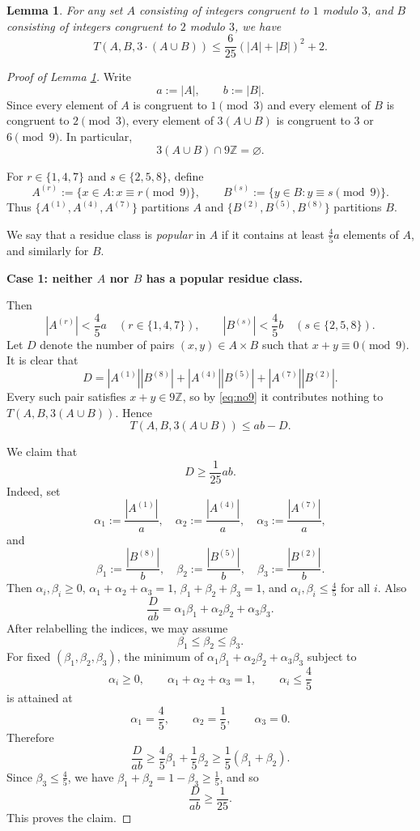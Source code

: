 \documentclass[10pt,a4paper]{amsart}
\newtheorem{lemma}{Lemma}
\begin{document}
\begin{lemma}
\label{lemma ABAcupB}
For any set $A$ consisting of integers congruent to $1$ modulo $3$, and $B$ consisting of integers congruent to $2$ modulo $3$, we have 
$$T(A, B, 3 \cdot (A \cup B)) \leq \frac{6}{25} \left(|A| + |B|\right)^2 + 2.$$
\end{lemma}

\begin{proof}[Proof of Lemma \ref{lemma ABAcupB}]
Write
\[
a:=|A|,\qquad b:=|B|.
\]
Since every element of $A$ is congruent to $1 \pmod 3$ and every element of $B$ is congruent to $2 \pmod 3$, every element of $3(A\cup B)$ is congruent to $3$ or $6 \pmod 9$. In particular,
\begin{equation}
\label{eq:no9}
3(A\cup B)\cap 9\mathbb Z=\varnothing.
\end{equation}

For $r\in\{1,4,7\}$ and $s\in\{2,5,8\}$, define
\[
A^{(r)}:=\{x\in A:x\equiv r \pmod 9\},\qquad
B^{(s)}:=\{y\in B:y\equiv s \pmod 9\}.
\]
Thus $\{A^{(1)},A^{(4)},A^{(7)}\}$ partitions $A$ and $\{B^{(2)},B^{(5)},B^{(8)}\}$ partitions $B$.

We say that a residue class is \emph{popular} in $A$ if it contains at least $\frac45a$ elements of $A$, and similarly for $B$.

\medskip
\noindent\textbf{Case 1: neither $A$ nor $B$ has a popular residue class.}

Then
\[
|A^{(r)}|<\frac45a\quad (r\in\{1,4,7\}),\qquad
|B^{(s)}|<\frac45b\quad (s\in\{2,5,8\}).
\]
Let $D$ denote the number of pairs $(x,y)\in A\times B$ such that $x+y\equiv 0\pmod 9$. It is clear that
\[
D=|A^{(1)}||B^{(8)}|+|A^{(4)}||B^{(5)}|+|A^{(7)}||B^{(2)}|.
\]
Every such pair satisfies $x+y\in 9\mathbb Z$, so by \eqref{eq:no9} it contributes nothing to $T(A,B,3(A\cup B))$. Hence
\begin{equation}
\label{eq:TleabminusD}
T(A,B,3(A\cup B))\le ab-D.
\end{equation}

We claim that
\[
D\ge \frac1{25}ab.
\]
Indeed, set
\[
\alpha_1:=\frac{|A^{(1)}|}{a},\quad
\alpha_2:=\frac{|A^{(4)}|}{a},\quad
\alpha_3:=\frac{|A^{(7)}|}{a},
\]
and
\[
\beta_1:=\frac{|B^{(8)}|}{b},\quad
\beta_2:=\frac{|B^{(5)}|}{b},\quad
\beta_3:=\frac{|B^{(2)}|}{b}.
\]
Then $\alpha_i,\beta_i\ge 0$, $\alpha_1+\alpha_2+\alpha_3=1$, $\beta_1+\beta_2+\beta_3=1$, and $\alpha_i,\beta_i\le \frac45$ for all $i$. Also
\[
\frac{D}{ab}=\alpha_1\beta_1+\alpha_2\beta_2+\alpha_3\beta_3.
\]
After relabelling the indices, we may assume
\[
\beta_1\le \beta_2\le \beta_3.
\]
For fixed $(\beta_1,\beta_2,\beta_3)$, the minimum of $\alpha_1\beta_1+\alpha_2\beta_2+\alpha_3\beta_3$ subject to
\[
\alpha_i\ge 0,\qquad \alpha_1+\alpha_2+\alpha_3=1,\qquad \alpha_i\le \frac45
\]
is attained at
\[
\alpha_1=\frac45,\qquad \alpha_2=\frac15,\qquad \alpha_3=0.
\]
Therefore
\[
\frac{D}{ab}\ge \frac45\beta_1+\frac15\beta_2\ge \frac15(\beta_1+\beta_2).
\]
Since $\beta_3\le \frac45$, we have $\beta_1+\beta_2=1-\beta_3\ge \frac15$, and so
\[
\frac{D}{ab}\ge \frac1{25}.
\]
This proves the claim.


\end{proof}
\end{document}

